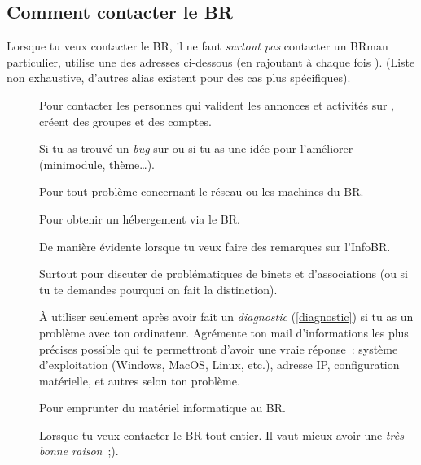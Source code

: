\subsection{Comment contacter le BR}
\label{contact}
Lorsque tu veux contacter le BR, il ne faut \emph{surtout pas} contacter un BRman particulier, utilise une des adresses ci-dessous (en rajoutant à chaque fois ). (Liste non exhaustive, d'autres alias existent pour des cas plus spécifiques).

\begin{description}

\item[] Pour contacter les personnes qui valident les annonces et activités sur \fkz, créent des groupes et des comptes.

\item[] Si tu as trouvé un \emph{bug} sur \fkz ou si tu as une idée pour l'améliorer (minimodule, thème\dots).

\item[] Pour tout problème concernant le réseau ou les machines du BR.

\item[] Pour obtenir un hébergement via le BR.


\item[] De manière évidente lorsque tu veux faire des remarques sur l'InfoBR.

\item[] Surtout pour discuter de problématiques de binets et d'associations (ou si tu te demandes pourquoi on fait la distinction).


\item[] À utiliser seulement après avoir fait un \emph{diagnostic} (\ref{diagnostic}) si tu as un problème avec ton ordinateur. Agrémente ton mail d'informations les plus précises possible qui te permettront d'avoir une vraie réponse~: système d'exploitation (Windows, MacOS, Linux, etc.), adresse IP, configuration matérielle, et autres selon ton problème.

\item[] Pour emprunter du matériel informatique au BR.

\item[] Lorsque tu veux contacter le BR tout entier. Il vaut mieux avoir une \emph{très bonne raison}~;).

\end{description}
